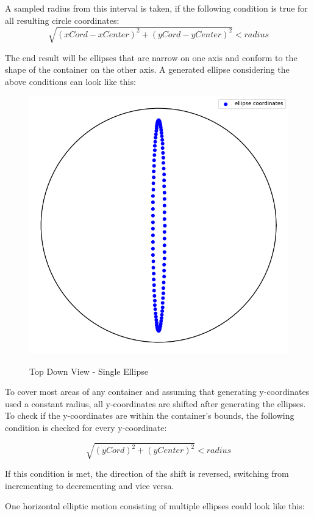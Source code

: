 A sampled radius from this interval is taken, if the following condition is true for all resulting circle coordinates:
\[\sqrt{(xCord - xCenter)^2 + (yCord - yCenter)^2} < radius\] 

The end result will be ellipses that are narrow on one axis and conform to the shape of the container on the other axis.
A generated ellipse considering the above conditions can look like this:

\begin{figure}[H]
    \includegraphics[scale=0.35]{Graphics/motions/ellipse.png}
    \centering
    \label{fig:foldingMotion1}
    \caption{Top Down View - Single Ellipse}
\end{figure}


To cover most areas of any container and assuming that generating y-coordinates used a constant radius, all y-coordinates are shifted after generating the ellipses. 
To check if the y-coordinates are within the container's bounds, the following condition is checked for every y-coordinate:

\[\sqrt{(yCord)^2 + (yCenter)^2} < radius\]

If this condition is met, the direction of the shift is reversed, switching from incrementing to decrementing and vice versa.

One horizontal elliptic motion consisting of multiple ellipses could look like this:


